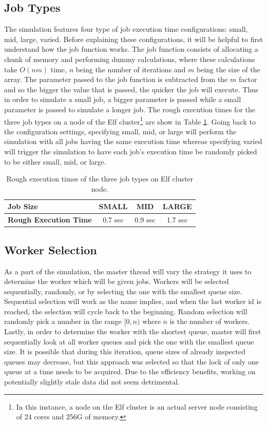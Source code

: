 \documentclass{article}
\begin{document}
\subsection{Job Types}
The simulation features four type of job execution time configurations: small, mid, large, varied. Before explaining these configurations, it will be helpful to first understand how the job function works. The job function consists of allocating a chunk of memory and performing dummy calculations, where these calculations take $O(nm)$ time, $n$ being the number of iterations and $m$ being the size of the array. The parameter passed to the job function is subtracted from the $m$ factor and so the bigger the value that is passed, the quicker the job will execute. Thus in order to simulate a small job, a bigger parameter is passed while a small parameter is passed to simulate a longer job. The rough execution times for the three job types on a node of the Elf cluster\footnote{In this instance, a node on the Elf cluster is an actual server node consisting of 24 cores and 256G of memory.} are show in Table \ref{jobExecution}. Going back to the configuration settings, specifying small, mid, or large will perform the simulation with all jobs having the same execution time whereas specifying varied will trigger the simulation to have each job's execution time be randomly picked to be either small, mid, or large.

\begin{table}
\centering
\begin{tabular}{|l | c | c | c | }
\hline
\textbf{Job Size} & SMALL & MID & LARGE \\
\hline
\textbf{Rough Execution Time} & 0.7 sec & 0.9 sec & 1.7 sec \\
\hline
\end{tabular}
\caption{Rough execution times of the three job types on Elf cluster node. \label{jobExecution}}
\end{table}

\subsection{Worker Selection}
As a part of the simulation, the master thread will vary the strategy it uses to determine the worker which will be given jobs. Workers will be selected sequentially, randomly, or by selecting the one with the smallest queue size. Sequential selection will work as the name implies, and when the last worker id is reached, the selection will cycle back to the beginning. Random selection will randomly pick a number in the range $[0, n)$ where $n$ is the number of workers. Lastly, in order to determine the worker with the shortest queue, master will first sequentially look at all worker queues and pick the one with the smallest queue size. It is possible that during this iteration, queue sizes of already inspected queues may decrease, but this approach was selected so that the lock of only one queue at a time needs to be acquired. Due to the efficiency benefits, working on potentially slightly stale data did not seem detrimental.
\end{document}
